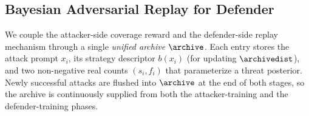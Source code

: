 \subsection{Bayesian Adversarial Replay for Defender}
\label{sec:method-replay}

We couple the attacker-side coverage reward and the defender-side replay mechanism through a single \emph{unified archive} $\archive$. Each entry stores the attack prompt $x_i$, its strategy descriptor $b(x_i)$ (for updating $\archivedist$), and two non-negative real counts $(s_i,f_i)$ that parameterize a threat posterior. Newly successful attacks are flushed into $\archive$ at the end of both stages, so the archive is continuously supplied from both the attacker-training and the defender-training phases.


